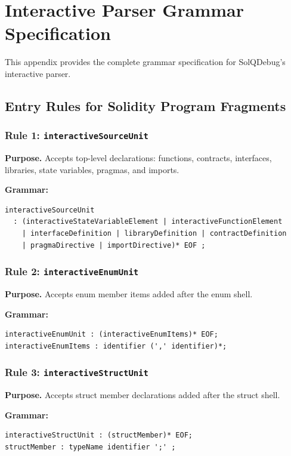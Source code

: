 \documentclass[pdflatex,sn-basic]{sn-jnl}%
\theoremstyle{thmstyleone}%
\theoremstyle{thmstyletwo}%
\theoremstyle{thmstylethree}%
\begin{document}
\FloatBarrier
\newpage
\appendix

\section{Interactive Parser Grammar Specification}
\label{appendix:interactive-grammar}

This appendix provides the complete grammar specification for SolQDebug's interactive parser.

\subsection{Entry Rules for Solidity Program Fragments}

\subsubsection{Rule 1: \texttt{interactiveSourceUnit}}
\noindent\textbf{Purpose.} Accepts top-level declarations: functions, contracts, interfaces, libraries, state variables, pragmas, and imports.

\noindent\textbf{Grammar:}
\begin{verbatim}
interactiveSourceUnit
  : (interactiveStateVariableElement | interactiveFunctionElement
    | interfaceDefinition | libraryDefinition | contractDefinition
    | pragmaDirective | importDirective)* EOF ;
\end{verbatim}

\subsubsection{Rule 2: \texttt{interactiveEnumUnit}}
\noindent\textbf{Purpose.} Accepts enum member items added after the enum shell.

\noindent\textbf{Grammar:}
\begin{verbatim}
interactiveEnumUnit : (interactiveEnumItems)* EOF;
interactiveEnumItems : identifier (',' identifier)*;
\end{verbatim}

\subsubsection{Rule 3: \texttt{interactiveStructUnit}}
\noindent\textbf{Purpose.} Accepts struct member declarations added after the struct shell.

\noindent\textbf{Grammar:}
\begin{verbatim}
interactiveStructUnit : (structMember)* EOF;
structMember : typeName identifier ';' ;
\end{verbatim}
\end{document}
